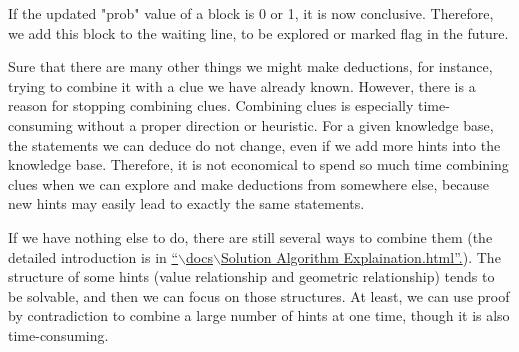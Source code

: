\documentclass[letter]{article}
\begin{document}
\begin{enumerate}
	If the updated "prob" value of a block is 0 or 1, it is now conclusive. Therefore, we add this block to the waiting line, to be explored or marked flag in the future.
	
	Sure that there are many other things we might make deductions, for instance, trying to combine it with a clue we have already known. However, there is a reason for stopping combining clues. Combining clues is especially time-consuming without a proper direction or heuristic. For a given knowledge base, the statements we can deduce do not change, even if we add more hints into the knowledge base. Therefore, it is not economical to spend so much time combining clues when we can explore and make deductions from somewhere else, because new hints may easily lead to exactly the same statements.
	
	If we have nothing else to do, there are still several ways to combine them (the detailed introduction is in \href{run:Solution Algorithm Explaination.html}{``$ \backslash $docs$ \backslash $Solution Algorithm Explaination.html''.}). The structure of some hints (value relationship and geometric relationship) tends to be solvable, and then we can focus on those structures. At least, we can use proof by contradiction to combine a large number of hints at one time, though it is also time-consuming.
	

\end{enumerate}
\end{document}
